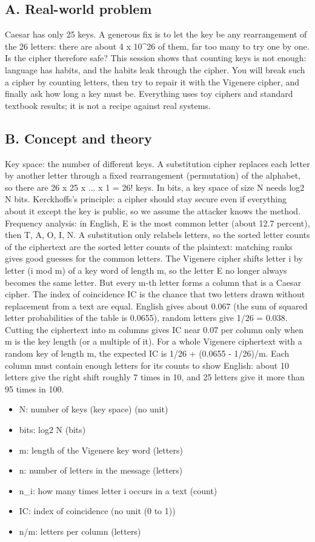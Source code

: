 \documentclass[11pt,a4paper]{article}
\begin{document}
\subsection*{A. Real-world problem}
Caesar has only 25 keys. A generous fix is to let the key be any rearrangement of the 26 letters: there are about 4 x 10\textasciicircum{}26 of them, far too many to try one by one. Is the cipher therefore safe? This session shows that counting keys is not enough: language has habits, and the habits leak through the cipher. You will break such a cipher by counting letters, then try to repair it with the Vigenere cipher, and finally ask how long a key must be. Everything uses toy ciphers and standard textbook results; it is not a recipe against real systems.

\subsection*{B. Concept and theory}
Key space: the number of different keys. A substitution cipher replaces each letter by another letter through a fixed rearrangement (permutation) of the alphabet, so there are 26 x 25 x ... x 1 = 26! keys. In bits, a key space of size N needs log2 N bits. Kerckhoffs's principle: a cipher should stay secure even if everything about it except the key is public, so we assume the attacker knows the method. Frequency analysis: in English, E is the most common letter (about 12.7 percent), then T, A, O, I, N. A substitution only relabels letters, so the sorted letter counts of the ciphertext are the sorted letter counts of the plaintext: matching ranks gives good guesses for the common letters. The Vigenere cipher shifts letter i by letter (i mod m) of a key word of length m, so the letter E no longer always becomes the same letter. But every m-th letter forms a column that is a Caesar cipher. The index of coincidence IC is the chance that two letters drawn without replacement from a text are equal. English gives about 0.067 (the sum of squared letter probabilities of the table is 0.0655), random letters give 1/26 = 0.038. Cutting the ciphertext into m columns gives IC near 0.07 per column only when m is the key length (or a multiple of it). For a whole Vigenere ciphertext with a random key of length m, the expected IC is 1/26 + (0.0655 - 1/26)/m. Each column must contain enough letters for its counts to show English: about 10 letters give the right shift roughly 7 times in 10, and 25 letters give it more than 95 times in 100.

\begin{itemize}[nosep]
\item N: number of keys (key space) (no unit)
\item bits: log2 N (bits)
\item m: length of the Vigenere key word (letters)
\item n: number of letters in the message (letters)
\item n\_i: how many times letter i occurs in a text (count)
\item IC: index of coincidence (no unit (0 to 1))
\item n/m: letters per column (letters)
\end{itemize}
\end{document}
